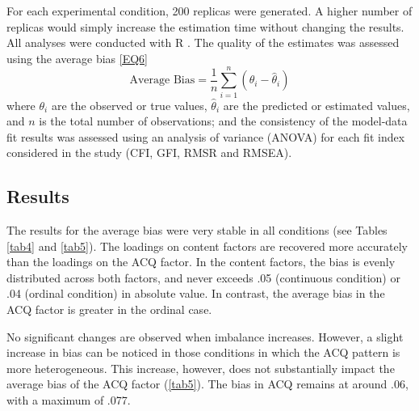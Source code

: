 For each experimental condition, 200 replicas were generated. A higher number of replicas would simply increase the estimation time without changing the results. All analyses were conducted with R \citep{RCore:2024}. The quality of the estimates was assessed using the average bias \eqref{EQ6}
\begin{equation}
  \label{EQ6}
  \text{Average Bias} = \frac{1}{n} \sum_{i=1}^{n} (\theta_i - \hat{\theta}_i)
\end{equation}
where \( \theta_i \) are the observed or true values, \( \hat{\theta}_i \) are the predicted or estimated values, and \( n \) is the total number of observations; and the consistency of the model-data fit results was assessed using an analysis of variance (ANOVA) for each fit index considered in the study (CFI, GFI, RMSR and RMSEA).

\subsection{Results}

The results for the average bias were very stable in all conditions (see Tables \ref{tab4} and \ref{tab5}). The loadings on content factors are recovered more accurately than the loadings on the ACQ factor. In the content factors, the bias is evenly distributed across both factors, and never exceeds .05 (continuous condition) or .04 (ordinal condition) in absolute value. In contrast, the average bias in the ACQ factor is greater in the ordinal case.

No significant changes are observed when imbalance increases. However, a slight increase in bias can be noticed in those conditions in which the ACQ pattern is more heterogeneous. This increase, however, does not substantially impact the average bias of the ACQ factor (\cref{tab5}). The bias in ACQ remains at around .06, with a maximum of .077.

